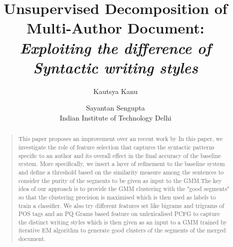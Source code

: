 \documentclass[letterpaper]{article}
\begin{document}
%
\title{Unsupervised Decomposition of Multi-Author Document:\\\textit{Exploiting the difference of Syntactic writing styles}}
\author{Kautsya Kanu \and   Sayantan Sengupta\\ 
Indian Institute of Technology Delhi\\
}
\maketitle

 \begin{abstract}
 \begin{quote}
 This paper proposes an improvement over an recent work by 
In this paper, we investigate the role of feature  selection  that captures the syntactic patterns specific to an author and its overall effect in the final accuracy of the baseline system. More specifically, we insert a layer of refinement to the baseline system and define a threshold based on the similarity measure among the sentences to consider the purity of the segments to be given as input to the GMM.The key idea of our approach is to provide the GMM clustering with the "good segments" so that the clustering precision is maximised which is then used as labels to train a classifier. We also try different features set like bigrams and trigrams of POS tags and an PQ Grams based feature on unlexicalised PCFG to capture the distinct writing styles which is then given as an input to a GMM trained by  iterative EM algorithm to generate good clusters of the segments of the merged document.
 \end{quote}
 \end{abstract}
\end{document}
